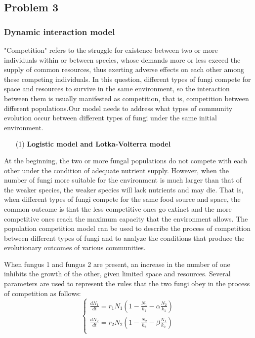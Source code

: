 \subsection{Problem 3}
\subsubsection{Dynamic interaction model}

"Competition" refers to the struggle for existence between two or more individuals within or between species, whose demands more or less exceed the supply of common resources, thus exerting adverse effects on each other among these competing individuals. In this question, different types of fungi compete for space and resources to survive in the same environment, so the interaction between them is usually manifested as competition, that is, competition between different populations.Our model needs to address what types of community evolution occur between different types of fungi under the same initial environment.
\begin{itemize}
    \item [(1)] 
    \textbf{Logistic model and Lotka-Volterra model}
\end{itemize}

At the beginning, the two or more fungal populations do not compete with each other under the condition of adequate nutrient supply. However, when the number of fungi more suitable for the environment is much larger than that of the weaker species, the weaker species will lack nutrients and may die. That is, when different types of fungi compete for the same food source and space, the common outcome is that the less competitive ones go extinct and the more competitive ones reach the maximum capacity that the environment allows. The population competition model can be used to describe the process of competition between different types of fungi and to analyze the conditions that produce the evolutionary outcomes of various communities.

When fungus 1 and fungus 2 are present, an increase in the number of one inhibits the growth of the other, given limited space and resources. Several parameters are used to represent the rules that the two fungi obey in the process of competition as follows:
\begin{equation}\label{3.1}
    \left\{
    \begin{array}{l}
        \frac{dN_{1}}{dt}=r_{1}N_{1}(1-\frac{N_{1}}{k_{1}}-\alpha \frac{N_{2}}{k_{1}}) \\
        \frac{dN_{2}}{dt}=r_{2}N_{2}(1-\frac{N_{2}}{k_{2}}-\beta \frac{N_{1}}{k_{2}}) \\
    \end{array}
    \right.
    \end{equation}

